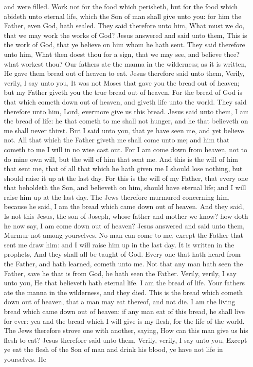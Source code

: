 and were filled. Work not for the food which perisheth, but for the food which abideth unto eternal life, which the Son of man shall give unto you: for him the Father, even God, hath sealed. They said therefore unto him, What must we do, that we may work the works of God? Jesus answered and said unto them, This is the work of God, that ye believe on him whom he hath sent. They said therefore unto him, What then doest thou for a sign, that we may see, and believe thee? what workest thou? Our fathers ate the manna in the wilderness; as it is written, He gave them bread out of heaven to eat. Jesus therefore said unto them, Verily, verily, I say unto you, It was not Moses that gave you the bread out of heaven; but my Father giveth you the true bread out of heaven. For the bread of God is that which cometh down out of heaven, and giveth life unto the world. They said therefore unto him, Lord, evermore give us this bread. Jesus said unto them, I am the bread of life: he that cometh to me shall not hunger, and he that believeth on me shall never thirst. But I said unto you, that ye have seen me, and yet believe not. All that which the Father giveth me shall come unto me; and him that cometh to me I will in no wise cast out. For I am come down from heaven, not to do mine own will, but the will of him that sent me. And this is the will of him that sent me, that of all that which he hath given me I should lose nothing, but should raise it up at the last day. For this is the will of my Father, that every one that beholdeth the Son, and believeth on him, should have eternal life; and I will raise him up at the last day.  The Jews therefore murmured concerning him, because he said, I am the bread which came down out of heaven. And they said, Is not this Jesus, the son of Joseph, whose father and mother we know? how doth he now say, I am come down out of heaven? Jesus answered and said unto them, Murmur not among yourselves. No man can come to me, except the Father that sent me draw him: and I will raise him up in the last day. It is written in the prophets, And they shall all be taught of God. Every one that hath heard from the Father, and hath learned, cometh unto me. Not that any man hath seen the Father, save he that is from God, he hath seen the Father. Verily, verily, I say unto you, He that believeth hath eternal life. I am the bread of life. Your fathers ate the manna in the wilderness, and they died. This is the bread which cometh down out of heaven, that a man may eat thereof, and not die. I am the living bread which came down out of heaven: if any man eat of this bread, he shall live for ever: yea and the bread which I will give is my flesh, for the life of the world.  The Jews therefore strove one with another, saying, How can this man give us his flesh to eat? Jesus therefore said unto them, Verily, verily, I say unto you, Except ye eat the flesh of the Son of man and drink his blood, ye have not life in yourselves. He 